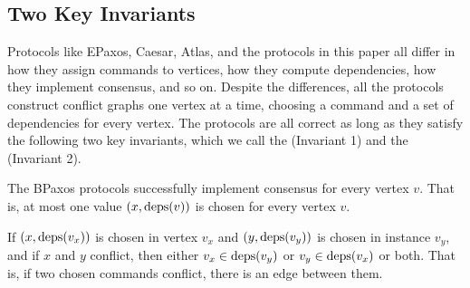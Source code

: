\subsection{Two Key Invariants}
Protocols like EPaxos, Caesar, Atlas, and the \BPaxos{} protocols in this paper
all differ in how they assign commands to vertices, how they compute
dependencies, how they implement consensus, and so on. Despite the differences,
all the protocols construct conflict graphs one vertex at a time, choosing a
command and a set of dependencies for every vertex. The protocols are all
correct as long as they satisfy the following two key invariants, which we call
the  (Invariant 1) and the  (Invariant 2).

\begin{invariant}
  The BPaxos protocols successfully implement consensus for every vertex $v$.
  That is, at most one value $(x, \text{deps}(v))$ is chosen for every vertex $v$.
\end{invariant}%

\begin{invariant}
  If $(x, \text{deps}(v_x))$ is chosen in vertex $v_x$ and $(y, \text{deps}(v_y))$ is
  chosen in instance $v_y$, and if $x$ and $y$ conflict, then either $v_x \in
  \text{deps}(v_y)$ or $v_y \in \text{deps}(v_x)$ or both. That is, if two chosen commands
  conflict, there is an edge between them.
\end{invariant}

%
% 

